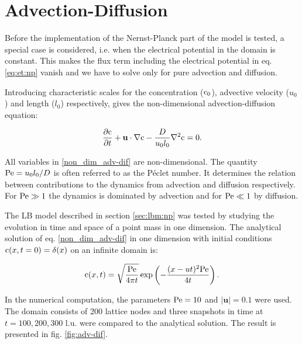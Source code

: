 \section{Advection-Diffusion}
Before the implementation of the Nernst-Planck part of the model is
tested, a special case is considered, i.e. when the electrical
potential in the domain is constant. This makes the flux term
including the electrical potential in eq. \eqref{eq:et:np} vanish
and we have to solve only for pure advection and diffusion.

Introducing characteristic scales for the concentration ($\mathrm{c}_0$),
advective velocity ($u_0$) and length ($l_0$) respectively, gives the
non-dimensional advection-diffusion equation:

\begin{equation}\label{non_dim_adv-dif}
\frac{\partial \mathrm{c}}{\partial t} + \mathbf{u} \cdot \nabla \mathrm{c} -
\frac{D}{u_0 l_0} \nabla^2\mathrm{c} = 0.
\end{equation}

All variables in \eqref{non_dim_adv-dif} are non-dimensional. The
quantity $\mathrm{Pe} = u_0l_0/D$ is often referred to as the P\'{e}clet number. It
determines the relation between contributions to the
dynamics from advection and diffusion respectively. For $\mathrm{Pe} \gg 1$ the
dynamics is dominated by advection and for $\mathrm{Pe} \ll 1$ by diffusion. 

The LB model described in section \ref{sec:lbm:np} was tested by
studying the evolution in time and space of a point mass in one
dimension. The analytical solution of eq. \eqref{non_dim_adv-dif} in
one dimension with initial conditions $\mathrm{c}(x, t = 0) = \delta(x)$ on an
infinite domain is:

\begin{equation}
\mathrm{c}(x, t) = \sqrt{\frac{\mathrm{Pe}}{4 \pi t}}\exp\left({-\frac{(x - ut)^2
    \mathrm{Pe}}{4t}}\right).
\end{equation}

In the numerical computation, the parameters $\mathrm{Pe} = 10$ and
$|\mathbf{u}| = 0.1$ were used. The domain consists of 200 lattice
nodes and three snapshots in time at $t = 100, 200, 300$ l.u. were
compared to the analytical solution. The result is presented in
fig. \ref{fig:adv-dif}.

